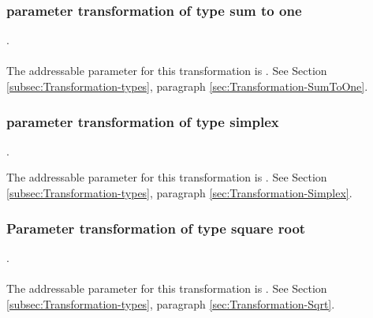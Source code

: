 \subsubsection{parameter transformation of type sum to one}
.
\label{syntax:Transformation-SumToOne} \\ \\
The addressable parameter for this transformation is . See Section \ref{subsec:Transformation-types}, paragraph \ref{sec:Transformation-SumToOne}.

\subsubsection{parameter transformation of type simplex}
.
\label{syntax:Transformation-Simplex}


The addressable parameter for this transformation is . See Section \ref{subsec:Transformation-types}, paragraph \ref{sec:Transformation-Simplex}.

\subsubsection{Parameter transformation of type square root}
.
\label{syntax:Transformation-Sqrt} \\ \\
The addressable parameter for this transformation is . See Section \ref{subsec:Transformation-types}, paragraph \ref{sec:Transformation-Sqrt}.


